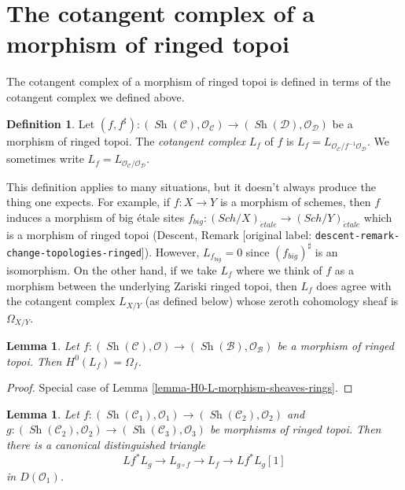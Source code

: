 \documentclass[10pt,a4paper]{article}
\theoremstyle{plain}
\newtheorem{lemma}[subsection]{Lemma}
\theoremstyle{definition}
\newtheorem{definition}[subsection]{Definition}
\theoremstyle{remark}
\numberwithin{equation}{subsection}
\def\Sch{\mathit{Sch}}
\def\Sh{\mathop{\mathit{Sh}}\nolimits}
\def\etale{{\acute{e}tale}}
\begin{document}
\section{The cotangent complex of a morphism of ringed topoi}
\label{section-cotangent-morphism-ringed-topoi}

\noindent
The cotangent complex of a morphism of ringed topoi is defined
in terms of the cotangent complex we defined above.

\begin{definition}
\label{definition-cotangent-complex-morphism-ringed-topoi}
Let $(f, f^\sharp) : (\Sh(\mathcal{C}), \mathcal{O}_\mathcal{C}) \to
(\Sh(\mathcal{D}), \mathcal{O}_\mathcal{D})$ be a morphism of ringed topoi.
The {\it cotangent complex} $L_f$ of $f$ is
$L_f = L_{\mathcal{O}_\mathcal{C}/f^{-1}\mathcal{O}_\mathcal{D}}$.
We sometimes write $L_f = L_{\mathcal{O}_\mathcal{C}/\mathcal{O}_\mathcal{D}}$.
\end{definition}

\noindent
This definition applies to many situations, but it doesn't always produce
the thing one expects. For example, if $f : X \to Y$ is a morphism of
schemes, then $f$ induces a morphism of big \'etale sites
$f_{big} : (\Sch/X)_\etale \to (\Sch/Y)_\etale$
which is a morphism of ringed topoi (Descent, Remark
\textnormal{[original label: \nolinkurl{descent-remark-change-topologies-ringed}]}).
However, $L_{f_{big}} = 0$ since $(f_{big})^\sharp$ is an isomorphism.
On the other hand, if we take $L_f$ where we think of $f$ as a morphism
between the underlying Zariski ringed topoi, then $L_f$ does agree with
the cotangent complex $L_{X/Y}$ (as defined below)
whose zeroth cohomology sheaf is $\Omega_{X/Y}$.

\begin{lemma}
\label{lemma-H0-L-morphism-ringed-topoi}
Let $f : (\Sh(\mathcal{C}), \mathcal{O}) \to
(\Sh(\mathcal{B}), \mathcal{O}_\mathcal{B})$ be a morphism of
ringed topoi. Then $H^0(L_f) = \Omega_f$.
\end{lemma}

\begin{proof}
Special case of Lemma \ref{lemma-H0-L-morphism-sheaves-rings}.
\end{proof}

\begin{lemma}
\label{lemma-triangle-ringed-topoi}
Let $f : (\Sh(\mathcal{C}_1), \mathcal{O}_1) \to
(\Sh(\mathcal{C}_2), \mathcal{O}_2)$ and
$g : (\Sh(\mathcal{C}_2), \mathcal{O}_2) \to
(\Sh(\mathcal{C}_3), \mathcal{O}_3)$ be morphisms of ringed topoi.
Then there is a canonical distinguished triangle
$$
Lf^* L_g \to L_{g \circ f} \to L_f \to Lf^*L_g[1]
$$
in $D(\mathcal{O}_1)$.
\end{lemma}
\end{document}
